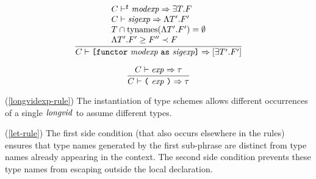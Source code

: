\begin{equation}        %
\label{functoratexp-rule}
 \frac{\begin{array}{l}
       \C\ts^\expectfun\modexp\ra\exmod{\T}{\F} \\
       \C\ts\sigexp\ra\sig{\T'}{\F'} \\
       \T \cap \TyNamesFcn (\sig{\T'}{\F'}) = \emptyset \\
       \siginstantiates{\sig{\T'}{\F'}}{\F''}\prec\F\\ 
      \end{array}}
      {\C\ts\functoratexp\ra\packagetype{\exmod{\T'}{\F'}}}%
\end{equation}





\begin{equation}	%
\frac{\C\ts\exp\ra\tau}
     {\C\ts\parexp\ra\tau}
\end{equation}
\comments
\begin{description}
\item{(\ref{longvidexp-rule})}  %
The instantiation of 
type schemes allows different occurrences of a single ${\it longvid}$ 
to assume different types.
\item{(\ref{let-rule})} 
The first side condition (that also occurs elsewhere in the rules)
ensures that type names generated by the first sub-phrase are distinct
from type names already appearing in the context. 
The second side condition prevents these type names from escaping
outside the local declaration. 
\end{description}

